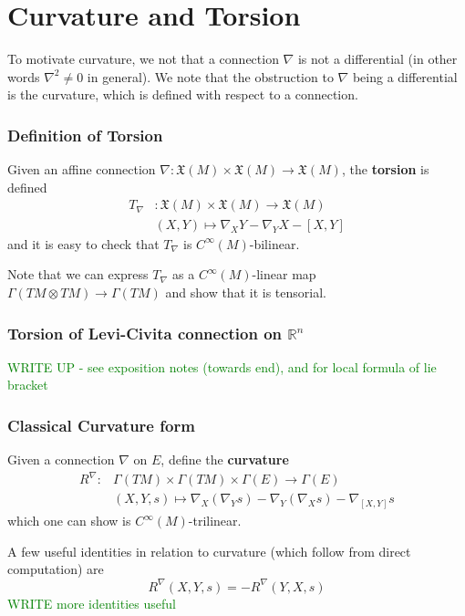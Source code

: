 \documentclass[a4paper]{article}
\theoremstyle{definition} \newtheorem*{definition}{Definition}
\theoremstyle{definition} \newtheorem*{definitions}{Definitions}
\theoremstyle{plain} \newtheorem{theorem}{Theorem}[section]
\theoremstyle{plain} \newtheorem{proposition}[theorem]{Proposition}
\theoremstyle{plain} \newtheorem{corollary}[theorem]{Corollary}
\theoremstyle{plain} \newtheorem{lemma}[theorem]{Lemma}
\theoremstyle{plain} \newtheorem{example}[theorem]{Example}
\newcommand{\finish}[1]{\textcolor{green}{#1}}
\newcommand{\defn}[1]{\textbf{#1}}
\newcommand{\realnos}{\mathbb{R}}
\newcommand{\smooth}{C^\infty}
\begin{document}
\section{Curvature and Torsion}

To motivate curvature, we not that a connection $\nabla$ is not a differential (in other words $\nabla^2\neq 0$ in general). We note that the obstruction to $\nabla$ being a differential is the curvature, which is defined with respect to a connection. 
 
\subsubsection{Definition of Torsion}
Given an affine connection $\nabla:\mathfrak{X}(M) \times \mathfrak{X}(M)\to \mathfrak{X}(M)$, the \defn{torsion} is defined
\begin{align*}
T_\nabla & : \mathfrak{X}(M)\times \mathfrak{X}(M)\to \mathfrak{X}(M)\\
& (X, Y)\mapsto \nabla_X Y - \nabla_Y X - [X, Y]
\end{align*}
and it is easy to check that $T_\nabla$ is $\smooth (M)$-bilinear.

Note that we can express $T_\nabla$ as a $\smooth (M)$-linear map $\Gamma(TM\otimes TM)\to \Gamma(TM)$ and show that it is tensorial. 

\subsubsection{Torsion of Levi-Civita connection on $\realnos^n$}
\finish{WRITE UP - see exposition notes (towards end), and for local formula of lie bracket}

\subsubsection{Classical Curvature form}
Given a connection $\nabla$ on $E$, define the \defn{curvature}
\begin{align*}
R^\nabla : & \Gamma(TM)\times \Gamma(TM)\times \Gamma(E)\to \Gamma(E) \\
& (X, Y, s) \mapsto \nabla_X(\nabla_Y s) - \nabla_Y(\nabla_X s) - \nabla_{[X, Y]} s
\end{align*}
which one can show is $\smooth (M)$-trilinear.

A few useful identities in relation to curvature (which follow from direct computation) are
$$R^\nabla (X, Y, s)=-R^\nabla (Y, X, s)$$
\finish{WRITE more identities useful}
\end{document}
